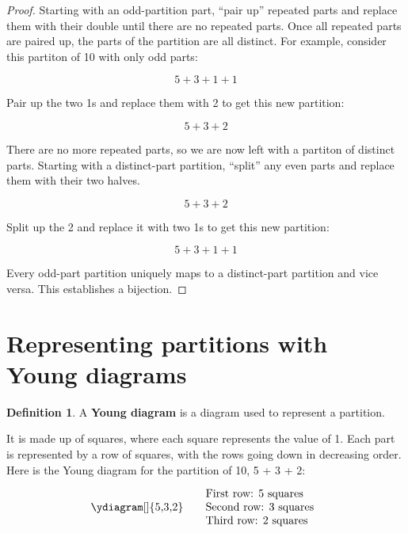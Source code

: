 \documentclass{article}
\theoremstyle{definition}
\newtheorem{definition}{Definition}
\begin{document}
\begin{proof}
Starting with an odd-partition part, ``pair up'' repeated parts and replace them with their double until there are
no repeated parts. Once all repeated parts are paired up, the parts of the partition are all distinct.
\newline For example, consider this partiton of 10 with only odd parts:

\[
5 + 3 + 1 + 1
\]

\noindent
Pair up the two 1s and replace them with 2 to get this new partition:

\[
5 + 3 + 2
\]

\noindent
There are no more repeated parts, so we are now left with a partiton of distinct parts.
\newline Starting with a distinct-part partition, ``split'' any even parts and replace them with their two halves.

\[
5 + 3 + 2
\]

\noindent
Split up the 2 and replace it with two 1s to get this new partition:

\[
5 + 3 + 1 + 1
\]

\noindent
Every odd-part partition uniquely maps to a distinct-part partition and vice versa. This establishes a bijection.
\end{proof}

\newpage

\section{Representing partitions with Young diagrams}

\begin{definition}
    A \textbf{Young diagram} is a diagram used to represent a partition.
\end{definition}

\noindent
It is made up of squares, where each square represents
the value of 1. Each part is represented by a row of squares, with the rows going down in decreasing order.
\newline Here is the Young diagram for the partition of 10, 5 + 3 + 2:

\[
\begin{minipage}{0.3\textwidth}
    \ydiagram[]
        {5,3,2}
\end{minipage}
\begin{minipage}{0.3\textwidth}
    First row: 5 squares \\
    Second row: 3 squares \\
    Third row: 2 squares
\end{minipage}
\]
\end{document}
